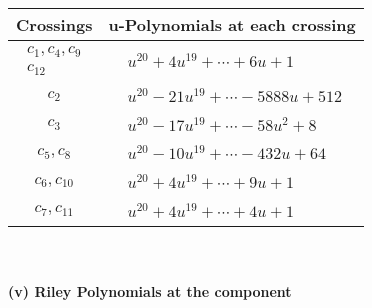 \documentclass[1p]{elsarticle_modified}
\theoremstyle{definition}
\begin{document}
\begin{tabular}{m{50pt}|m{274pt}}
Crossings & \hspace{64pt}u-Polynomials at each crossing \\
\hline $$\begin{aligned}c_{1},c_{4},c_{9}\\c_{12}\end{aligned}$$&$\begin{aligned}
&u^{20}+4 u^{19}+\cdots+6 u+1
\end{aligned}$\\
\hline $$\begin{aligned}c_{2}\end{aligned}$$&$\begin{aligned}
&u^{20}-21 u^{19}+\cdots-5888 u+512
\end{aligned}$\\
\hline $$\begin{aligned}c_{3}\end{aligned}$$&$\begin{aligned}
&u^{20}-17 u^{19}+\cdots-58 u^2+8
\end{aligned}$\\
\hline $$\begin{aligned}c_{5},c_{8}\end{aligned}$$&$\begin{aligned}
&u^{20}-10 u^{19}+\cdots-432 u+64
\end{aligned}$\\
\hline $$\begin{aligned}c_{6},c_{10}\end{aligned}$$&$\begin{aligned}
&u^{20}+4 u^{19}+\cdots+9 u+1
\end{aligned}$\\
\hline $$\begin{aligned}c_{7},c_{11}\end{aligned}$$&$\begin{aligned}
&u^{20}+4 u^{19}+\cdots+4 u+1
\end{aligned}$\\
\hline
\end{tabular}\\~\\
\newpage\renewcommand{\arraystretch}{1}
\flushleft \textbf{(v) Riley Polynomials at the component}\newline \\
\end{document}
